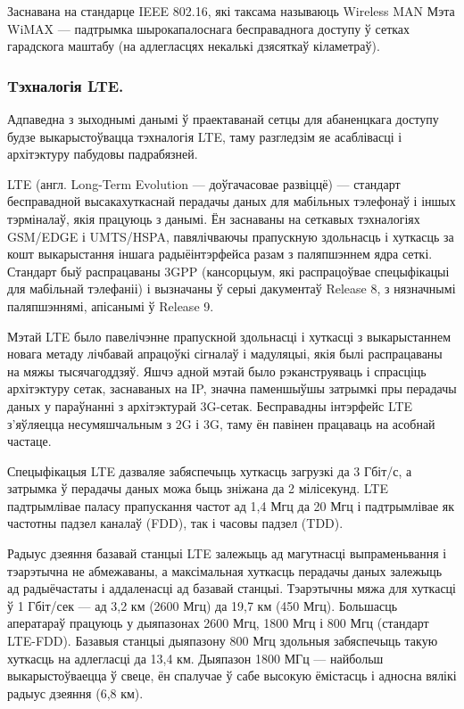Заснавана на стандарце IEEE 802.16, які таксама называюць Wireless MAN
Мэта WiMAX --- падтрымка шырокапалоснага бесправаднога доступу ў сетках гарадскога маштабу (на адлегласцях некалькі дзясяткаў кіламетраў).

\subsubsection{Tэхналогія LTE.}

Адпаведна з зыходнымі данымі ў праектаванай сетцы для абаненцкага
доступу будзе выкарыстоўвацца тэхналогія LTE, таму разгледзім яе
асаблівасці і архітэктуру пабудовы падрабязней.

LTE (англ. Long-Term Evolution --- доўгачасовае развіццё) --- стандарт бесправадной высакахуткаснай перадачы даных для мабільных тэлефонаў і іншых тэрміналаў, якія працуюць з данымі. Ён заснаваны на сеткавых тэхналогіях GSM/EDGE і UMTS/HSPA, павялічваючы прапускную здольнасць і хуткасць за кошт выкарыстання іншага радыёінтэрфейса разам з паляпшэннем ядра сеткі. Стандарт быў распрацаваны 3GPP (кансорцыум, які распрацоўвае спецыфікацыі для мабільнай тэлефаніі) і вызначаны ў серыі дакументаў Release 8, з нязначнымі паляпшэннямі, апісанымі ў Release 9.

Мэтай LTE было павелічэнне прапускной здольнасці і хуткасці з выкарыстаннем новага метаду лічбавай апрацоўкі сігналаў і мадуляцыі, якія былі распрацаваны на мяжы тысячагоддзяў. Яшчэ адной мэтай было рэканструяваць і спрасціць архітэктуру сетак, заснаваных на IP, значна паменшыўшы затрымкі пры перадачы даных у параўнанні з архітэктурай 3G-сетак. Бесправадны інтэрфейс LTE з'яўляецца несумяшчальным з 2G і 3G, таму ён павінен працаваць на асобнай частаце.

Спецыфікацыя LTE дазваляе забяспечыць хуткасць загрузкі да 3 Гбіт/с, а затрымка ў перадачы даных можа быць зніжана да 2 мілісекунд. LTE падтрымлівае паласу прапускання частот ад 1,4 Мгц да 20 Мгц і падтрымлівае як частотны падзел каналаў (FDD), так і часовы падзел (TDD).

Радыус дзеяння базавай станцыі LTE залежыць ад магутнасці выпраменьвання і тэарэтычна не абмежаваны, а максімальная хуткасць перадачы даных залежыць ад радыёчастаты і аддаленасці ад базавай станцыі. Тэарэтычны мяжа для хуткасці ў 1 Гбіт/сек --- ад 3,2 км (2600 Мгц) да 19,7 км (450 Мгц). Большасць аператараў працуюць у дыяпазонах 2600 Мгц, 1800 Мгц і 800 Мгц (стандарт LTE-FDD). Базавыя станцыі дыяпазону 800 Мгц здольныя забяспечыць такую хуткасць на адлегласці да 13,4 км. Дыяпазон 1800 МГц --- найбольш выкарыстоўваецца ў свеце, ён спалучае ў сабе высокую ёмістасць і адносна вялікі радыус дзеяння (6,8 км).

